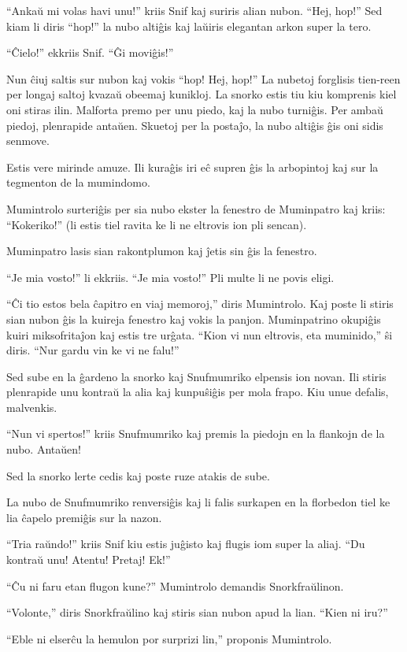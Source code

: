 ``Ankaŭ mi volas havi unu!'' kriis Snif kaj suriris alian nubon. ``Hej, hop!'' Sed kiam li diris ``hop!'' la nubo altiĝis kaj laŭiris elegantan arkon super la tero.

``Ĉielo!'' ekkriis Snif. ``Ĝi moviĝis!''

Nun ĉiuj saltis sur nubon kaj vokis ``hop! Hej, hop!'' La nubetoj forglisis tien-reen per longaj saltoj kvazaŭ obeemaj kunikloj. La snorko estis tiu kiu komprenis kiel oni stiras ilin. Malforta premo per unu piedo, kaj la nubo turniĝis. Per ambaŭ piedoj, plenrapide antaŭen. Skuetoj per la postaĵo, la nubo altiĝis ĝis oni sidis senmove.

Estis vere mirinde amuze. Ili kuraĝis iri eĉ supren ĝis la arbopintoj kaj sur la tegmenton de la mumindomo.

Mumintrolo surteriĝis per sia nubo ekster la fenestro de Muminpatro kaj kriis: ``Kokeriko!'' (li estis tiel ravita ke li ne eltrovis ion pli sencan).

Muminpatro lasis sian rakontplumon kaj ĵetis sin ĝis la fenestro.

``Je mia vosto!'' li ekkriis. ``Je mia vosto!'' Pli multe li ne povis eligi.

``Ĉi tio estos bela ĉapitro en viaj memoroj,'' diris Mumintrolo. Kaj poste li stiris sian nubon ĝis la kuireja fenestro kaj vokis la panjon. Muminpatrino okupiĝis kuiri miksofritaĵon kaj estis tre urĝata. ``Kion vi nun eltrovis, eta muminido,'' ŝi diris. ``Nur gardu vin ke vi ne falu!''

Sed sube en la ĝardeno la snorko kaj Snufmumriko elpensis ion novan. Ili stiris plenrapide unu kontraŭ la alia kaj kunpuŝiĝis per mola frapo. Kiu unue defalis, malvenkis.

``Nun vi spertos!'' kriis Snufmumriko kaj premis la piedojn en la flankojn de la nubo. Antaŭen!

Sed la snorko lerte cedis kaj poste ruze atakis de sube.

La nubo de Snufmumriko renversiĝis kaj li falis surkapen en la florbedon tiel ke lia ĉapelo premiĝis sur la nazon.

``Tria raŭndo!'' kriis Snif kiu estis juĝisto kaj flugis iom super la aliaj. ``Du kontraŭ unu! Atentu! Pretaj! Ek!''

``Ĉu ni faru etan flugon kune?'' Mumintrolo demandis Snorkfraŭlinon.

``Volonte,'' diris Snorkfraŭlino kaj stiris sian nubon apud la lian. ``Kien ni iru?''

``Eble ni elserĉu la hemulon por surprizi lin,'' proponis Mumintrolo.

